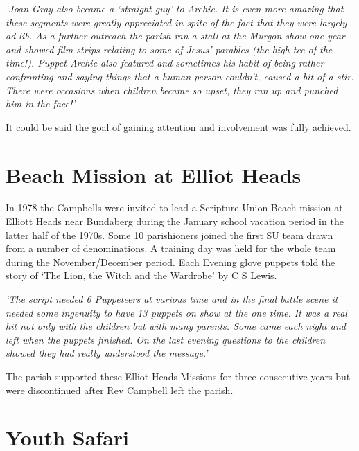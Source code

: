 \emph{`Joan Gray also became a `straight-guy' to Archie. It is even more amazing that these segments were greatly appreciated in spite of the fact that they were largely ad-lib. As a further outreach the parish ran a stall at the Murgon show one year and showed film strips relating to some of Jesus' parables (the high tec of the time!). Puppet Archie also featured and sometimes his habit of being rather confronting and saying things that a human person couldn't, caused a bit of a stir. There were occasions when children became so upset, they ran up and punched him in the face!'}



It could be said the goal of gaining attention and involvement was fully achieved.



\section{Beach Mission at Elliot Heads}



In 1978 the Campbells were invited to lead a Scripture Union Beach mission at Elliott Heads near Bundaberg during the January school vacation period in the latter half of the 1970s. Some 10 parishioners joined the first SU team drawn from a number of denominations. A training day was held for the whole team during the November/December period. Each Evening glove puppets told the story of `The Lion, the Witch and the Wardrobe' by C S Lewis.



\emph{`The script needed 6 Puppeteers at various time and in the final battle scene it needed some ingenuity to have 13 puppets on show at the one time. It was a real hit not only with the children but with many parents. Some came each night and left when the puppets finished. On the last evening questions to the children showed they had really understood the message.'}



The parish supported these Elliot Heads Missions for three consecutive years but were discontinued after Rev Campbell left the parish.



\section{Youth Safari}



